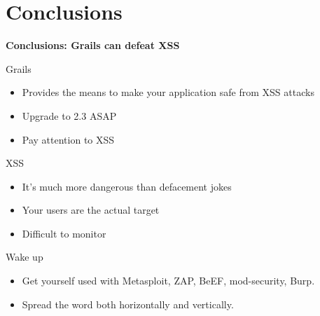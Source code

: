 
\section{Conclusions}

\begin{frame}[plain]
    \begin{center}
      \Huge\bfseries
      Conclusions: Grails can defeat XSS
    \end{center}
\end{frame}

\begin{frame}[plain]{Grails}
  \begin{itemize}
    \item Provides the means to make your application safe from XSS attacks
    \item Upgrade to 2.3 ASAP
    \item Pay attention to XSS
  \end{itemize}
\end{frame}

\begin{frame}[plain]{XSS}
  \begin{itemize}
    \item It's much more dangerous than defacement jokes
    \item Your users are the actual target
    \item Difficult to monitor
  \end{itemize}
\end{frame}

\begin{frame}[plain]{Wake up}
 \begin{itemize}[<+-| alert@+>]
   \item Get yourself used with Metasploit, ZAP, BeEF, mod-security, Burp.
   \item Spread the word both horizontally and vertically.
 \end{itemize}
\end{frame}
